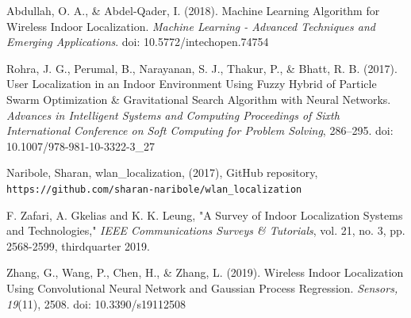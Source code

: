 \documentclass[12pt,letterpaper]{article}
\begin{document}

\begin{workscited}

\bibent
Abdullah, O. A., \& Abdel-Qader, I. (2018). Machine Learning Algorithm for Wireless Indoor Localization. \textit{Machine Learning - Advanced Techniques and Emerging Applications}. doi: 10.5772/intechopen.74754

\bibent
Rohra, J. G., Perumal, B., Narayanan, S. J., Thakur, P., \& Bhatt, R. B. (2017). User Localization in an Indoor Environment Using Fuzzy Hybrid of Particle Swarm Optimization \& Gravitational Search Algorithm with Neural Networks. \textit{Advances in Intelligent Systems and Computing Proceedings of Sixth International Conference on Soft Computing for Problem Solving}, 286–295. doi: 10.1007/978-981-10-3322-3\_27

\bibent
Naribole, Sharan, wlan\_localization, (2017), GitHub repository, \texttt{https://github.com/sharan-naribole/wlan\_localization}

\bibent
F. Zafari, A. Gkelias and K. K. Leung, "A Survey of Indoor Localization Systems and Technologies," \textit{IEEE Communications Surveys \& Tutorials}, vol. 21, no. 3, pp. 2568-2599, thirdquarter 2019.

\bibent
Zhang, G., Wang, P., Chen, H., \& Zhang, L. (2019). Wireless Indoor Localization Using Convolutional Neural Network and Gaussian Process Regression. \textit{Sensors, 19}(11), 2508. doi: 10.3390/s19112508

\end{workscited} 
\end{document}
